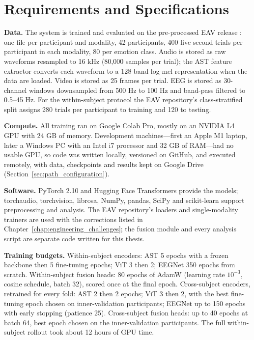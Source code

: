 \section{Requirements and Specifications}

\textbf{Data.} The system is trained and evaluated on the pre-processed EAV release \cite{Lee2024EAV}: one file per participant and modality, 42 participants, 400 five-second trials per participant in each modality, 80 per emotion class. Audio is stored as raw waveforms resampled to 16 kHz (80{,}000 samples per trial); the AST feature extractor converts each waveform to a 128-band log-mel representation when the data are loaded. Video is stored as 25 frames per trial. EEG is stored as 30-channel windows downsampled from 500 Hz to 100 Hz and band-pass filtered to 0.5--45 Hz. For the within-subject protocol the EAV repository's class-stratified split assigns 280 trials per participant to training and 120 to testing.

\textbf{Compute.} All training ran on Google Colab Pro, mostly on an NVIDIA L4 GPU with 24 GB of memory. Development machines---first an Apple M1 laptop, later a Windows PC with an Intel i7 processor and 32 GB of RAM---had no usable GPU, so code was written locally, versioned on GitHub, and executed remotely, with data, checkpoints and results kept on Google Drive (Section~\ref{sec:path_configuration}).

\textbf{Software.} PyTorch 2.10 and Hugging Face Transformers provide the models; torchaudio, torchvision, librosa, NumPy, pandas, SciPy and scikit-learn support preprocessing and analysis. The EAV repository's loaders and single-modality trainers are used with the corrections listed in Chapter~\ref{chap:engineering_challenges}; the fusion module and every analysis script are separate code written for this thesis.

\textbf{Training budgets.} Within-subject encoders: AST 5 epochs with a frozen backbone then 5 fine-tuning epochs; ViT 3 then 2; EEGNet 350 epochs from scratch. Within-subject fusion heads: 80 epochs of AdamW (learning rate $10^{-3}$, cosine schedule, batch 32), scored once at the final epoch. Cross-subject encoders, retrained for every fold: AST 2 then 2 epochs; ViT 3 then 2, with the best fine-tuning epoch chosen on inner-validation participants; EEGNet up to 150 epochs with early stopping (patience 25). Cross-subject fusion heads: up to 40 epochs at batch 64, best epoch chosen on the inner-validation participants. The full within-subject rollout took about 12 hours of GPU time.

